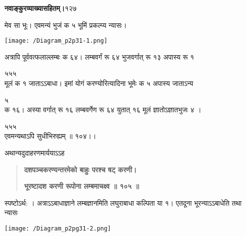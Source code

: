 \documentclass[11pt, openany]{book}
\begin{document}
\onehalfspacing
\hspace{2in}\textbf{नवाङ्कुरव्याख्यासहितम्।}\hspace{2in}१२७

\vspace{5mm}

\begin{sloppypar}
\hangindent=0.2in मेव सा भूः। एवमन्यं भुजं क ५ भूमिं प्रकल्प्य न्यासः।

\begin{center}
    \texttt{[image: /Diagram\_p2p31-1.png]}
\end{center}
\hangindent=0.2in \hspace{0.2in}अत्रापि पूर्ववत्फलाल्लम्बः क ६४। लम्बवर्गं रू ६४ भुजवर्गात् रू १३ अपास्य रू १

\hspace{1.75in}५\hspace{1in}५\hspace{1.8in}५\\

\hangindent=0.2in मूलं क १ जाताऽऽबाधा। इमां योगं करण्योरित्यादिना भूमेः क ५ अपास्य जाताऽन्य 

\hspace{0.5in}५ \\

\hangindent=0.2in क १६। अस्या वर्गात् रू १६ लम्बवर्गेण रू ६४ युतात् १६ मूलं ज्ञातोऽज्ञातभुजः ४ ।

\hspace{1.6in}५\hspace{1in}५\hspace{0.5in}५\\

\hangindent=0.2in एवमन्यथाऽपि सुधीभिरुह्यम् ॥ १०४।।

\hangindent=0.2in \hspace{0.2in}अथान्यदुदाहरणमार्ययाऽऽह\textendash

\begin{quote}
\hspace{1in}\textbf{दशपञ्चकरण्यन्तरमेको बाहुः परश्च षट् करणी।}

\hspace{1in}\textbf{भूरष्टादश करणी रूपोना लम्बमाचक्ष्व ॥ १०५ ॥}
\end{quote}

\hangindent=0.2in \hspace{0.2in}स्पष्टोऽर्थ: । अत्राऽऽबाधाज्ञाने लम्बज्ञानमिति लघुराबाधा कल्पिता या १। एतदूना भूरन्याऽऽबाधेति तथा न्यासः

\begin{center}
\texttt{[image: /Diagram\_p2pg31-2.png]}
\end{center}
\end{sloppypar}
\thispagestyle{empty}
\newpage
\end{document}
